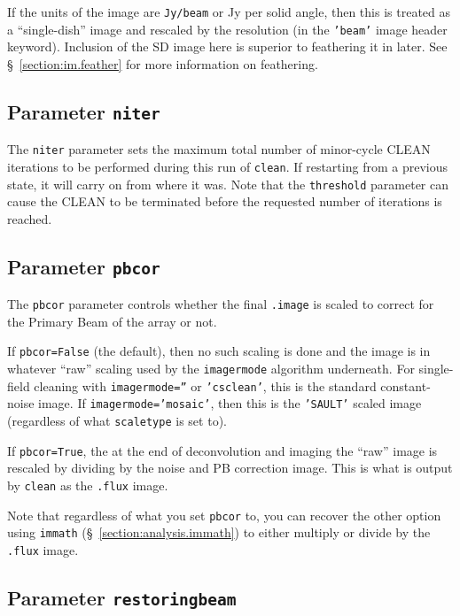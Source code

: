 If the units of the image are {\tt Jy/beam} or Jy per solid angle,
then this is treated as a ``single-dish'' image and rescaled by
the resolution (in the {\tt 'beam'} image header keyword). Inclusion
of the SD image here is superior to feathering it in later.
See \S~\ref{section:im.feather} for more information on feathering.

\subsection{Parameter {\tt niter} }
\label{section:im.clean.niter}

The {\tt niter} parameter sets the maximum total number of minor-cycle CLEAN
iterations to be performed during this run of {\tt clean}.  If restarting
from a previous state, it will carry on from where it was.  Note that
the {\tt threshold} parameter can cause the CLEAN to be terminated before
the requested number of iterations is reached.

\subsection{Parameter {\tt pbcor} }
\label{section:im.clean.pbcor}

The {\tt pbcor} parameter controls whether the final {\tt .image} 
is scaled to correct for the Primary Beam of the array or not.

If {\tt pbcor=False} (the default), then no such scaling is done
and the image is in whatever ``raw'' scaling used by the 
{\tt imagermode} algorithm underneath.  For single-field cleaning
with {\tt imagermode=''} or {\tt 'csclean'}, this is the standard
constant-noise image.  If {\tt imagermode='mosaic'}, then this is
the {\tt 'SAULT'} scaled image (regardless of what {\tt scaletype}
is set to).

If {\tt pbcor=True}, the at the end of deconvolution and imaging the
``raw'' image is rescaled by dividing by the noise and PB correction
image.  This is what is output by {\tt clean} as the {\tt .flux}
image.  

Note that regardless of what you set {\tt pbcor} to, you can recover
the other option using {\tt immath} (\S~\ref{section:analysis.immath})
to either multiply or divide by the {\tt .flux} image.

\subsection{Parameter {\tt restoringbeam} }
\label{section:im.clean.restoringbeam}

